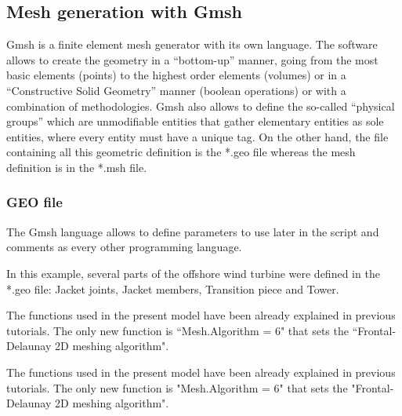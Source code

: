 \documentclass[a4]{article}
\begin{document}
\subsection{Mesh generation with Gmsh}
Gmsh \cite{gmsh, gmshweb} is a finite element mesh generator with its own language. The software allows to create the geometry in a “bottom-up” manner, going from the most basic elements (points) to the highest order elements (volumes) or in a “Constructive Solid Geometry” manner (boolean operations) or with a combination of methodologies. Gmsh also allows to define  the so-called “physical groups” which are unmodifiable entities that gather elementary entities as sole entities, where every entity must have a unique tag. On the other hand, the file containing all this geometric definition is the *.geo file whereas the mesh definition is in the *.msh file. 

\subsubsection{GEO file}
The Gmsh language allows to define parameters to use later in the script and comments as every other programming language. 

In this example, several parts of the offshore wind turbine were defined in the *.geo file: Jacket joints, Jacket members, Transition piece and Tower.  


The functions used in the present model have been already explained in previous tutorials. The only new function is ``Mesh.Algorithm = 6" that sets the ``Frontal-Delaunay 2D meshing algorithm".

The functions used in the present model have been already explained in previous tutorials. The only new function is "Mesh.Algorithm = 6" that sets the "Frontal-Delaunay 2D meshing algorithm".
\end{document}
